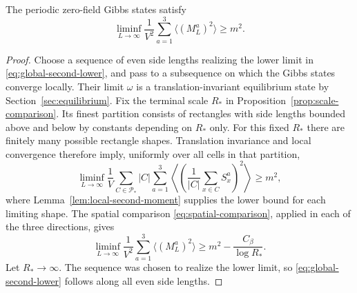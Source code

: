 \begin{proposition}\label{prop:global-second-moment}
The periodic zero-field Gibbs states satisfy
\begin{equation}\label{eq:global-second-lower}
 \liminf_{L\to\infty}\frac1{V^2}
        \sum_{a=1}^3\langle(M_L^a)^2\rangle\ge m^2.
\end{equation}
\end{proposition}
\begin{proof}
Choose a sequence of even side lengths realizing the lower limit in
\eqref{eq:global-second-lower}, and pass to a subsequence on which the
Gibbs states converge locally. Their limit
$\omega$ is a translation-invariant equilibrium state by
Section~\ref{sec:equilibrium}. Fix the terminal scale $R_*$ in
Proposition~\ref{prop:scale-comparison}. Its finest partition consists
of rectangles with side lengths bounded above and below by constants
depending on $R_*$ only. For this fixed $R_*$ there are finitely many
possible rectangle shapes. Translation invariance and local convergence
therefore imply, uniformly over all cells in that partition,
\[
 \liminf_{L\to\infty}
 \frac1V\sum_{C\in\mathcal P_*}|C|
       \sum_{a=1}^3
       \left\langle
          \left(\frac1{|C|}\sum_{x\in C}S_x^a\right)^2
       \right\rangle
       \ge m^2,
\]
where Lemma~\ref{lem:local-second-moment} supplies the lower bound for
each limiting shape. The spatial comparison
\eqref{eq:spatial-comparison}, applied in each of the three directions,
gives
\[
 \liminf_{L\to\infty}\frac1{V^2}
       \sum_{a=1}^3\langle(M_L^a)^2\rangle
       \ge m^2-\frac{C_\beta}{\log R_*}.
\]
Let $R_*\to\infty$. The sequence was chosen to realize the lower limit,
so \eqref{eq:global-second-lower} follows along all even side lengths.
\end{proof}

